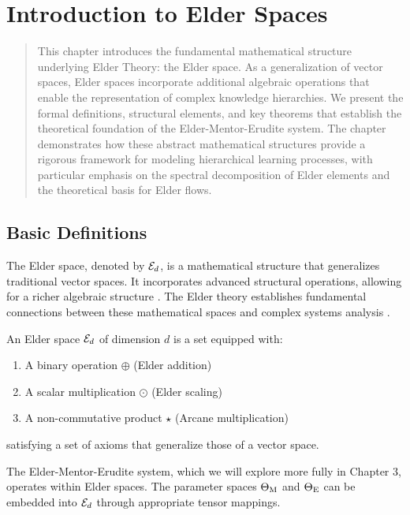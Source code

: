 \chapter{Introduction to Elder Spaces}

\begin{abstract}
This chapter introduces the fundamental mathematical structure underlying Elder Theory: the Elder space. As a generalization of vector spaces, Elder spaces incorporate additional algebraic operations that enable the representation of complex knowledge hierarchies. We present the formal definitions, structural elements, and key theorems that establish the theoretical foundation of the Elder-Mentor-Erudite system. The chapter demonstrates how these abstract mathematical structures provide a rigorous framework for modeling hierarchical learning processes, with particular emphasis on the spectral decomposition of Elder elements and the theoretical basis for Elder flows.
\end{abstract}

\section{Basic Definitions}

The Elder space, denoted by $\mathcal{E}_{d}$, is a mathematical structure that generalizes traditional vector spaces. It incorporates advanced structural operations, allowing for a richer algebraic structure \cite{elder_theory}. The Elder theory establishes fundamental connections between these mathematical spaces and complex systems analysis \cite{complex_mathematics}.

\begin{definition}
An Elder space $\mathcal{E}_{d}$ of dimension $d$ is a set equipped with:
\begin{enumerate}
    \item A binary operation $\oplus$ (Elder addition)
    \item A scalar multiplication $\odot$ (Elder scaling)
    \item A non-commutative product $\star$ (Arcane multiplication)
\end{enumerate}
satisfying a set of axioms that generalize those of a vector space.
\end{definition}

\begin{remark}
The Elder-Mentor-Erudite system, which we will explore more fully in Chapter 3, operates within Elder spaces. The parameter spaces $\Theta_{\text{M}}$ and $\Theta_{\text{E}}$ can be embedded into $\mathcal{E}_{d}$ through appropriate tensor mappings.
\end{remark}

